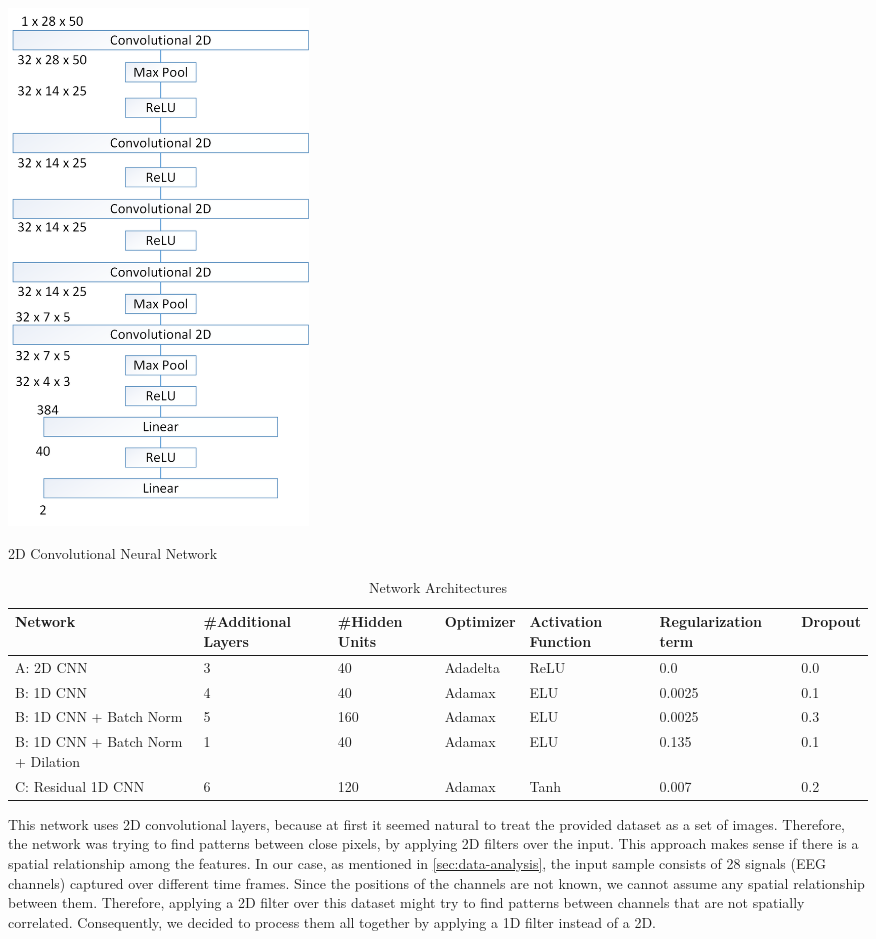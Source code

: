 \documentclass[10pt,conference,compsocconf]{IEEEtran}
\begin{document}
\begin{center}
	\captionsetup{type=figure}
	\includegraphics[width=0.35\textwidth]{img/Conv2D.png}
	\caption {2D Convolutional Neural Network}
	\label{fig:Conv2D}
\end{center}

\begin{table}
	\caption{Network Architectures}
	\label{tab:netarch}
	\begin{tabular}{ | p{3cm} | p{2cm} | p{2cm} | p{2cm} | p{2cm} | p{2cm} | p{2cm} | }
		\hline
		Network & \#Additional Layers & \#Hidden Units & Optimizer & Activation Function & Regularization term & Dropout\\
		\hline
		A: 2D CNN
		& 3 & 40 & Adadelta & ReLU & 0.0 & 0.0 \\
		\hline
		B: 1D CNN
		& 4 & 40 & Adamax & ELU & 0.0025 & 0.1 \\
		\hline
		B: 1D CNN + Batch Norm
		& 5 & 160 & Adamax & ELU & 0.0025 & 0.3 \\
		\hline
		B: 1D CNN + Batch Norm + Dilation
		& 1 & 40 & Adamax & ELU & 0.135 & 0.1 \\
		\hline
		C:	Residual 1D CNN
		& 6 & 120 & Adamax & Tanh & 0.007 & 0.2 \\
		\hline
	\end{tabular}
\end{table}

This network uses 2D convolutional layers, because at first it seemed natural to treat the provided dataset as a set of images. Therefore, the network was trying to find patterns between close pixels, by applying 2D filters over the input. This approach makes sense if there is a spatial relationship among the features. In our case, as mentioned in \ref{sec:data-analysis}, the input sample consists of 28 signals (EEG channels) captured over different time frames. Since the positions of the channels are not known, we cannot assume any spatial relationship between them. Therefore, applying a 2D filter over this dataset might try to find patterns between channels that are not spatially correlated. Consequently, we decided to process them all together by applying a 1D filter instead of a 2D. 
\end{document}
